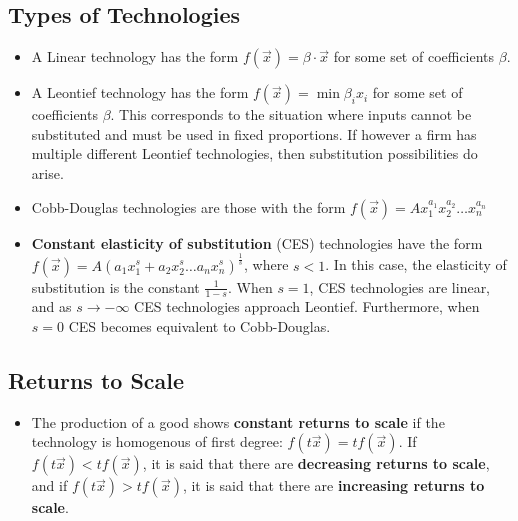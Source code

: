 \documentclass[a4paper]{article}
\begin{document}
\subsection{Types of Technologies}
\begin{itemize}
    \item A Linear technology has the form $f(\vec{x}) = \beta \cdot \vec{x}$ for some set of coefficients $\beta$.
    \item A Leontief technology has the form $f(\vec{x}) = \min{\beta_i x_i}$ for some set of coefficients $\beta$. This corresponds to the situation where inputs cannot be substituted and must be used in fixed proportions. If however a firm has multiple different Leontief technologies, then substitution possibilities do arise.
    \item Cobb-Douglas technologies are those with the form $f(\vec{x}) = Ax_1^{a_1}x_2^{a_2}\hdots x_n^{a_n}$
    \item \textbf{Constant elasticity of substitution} (CES) technologies have the form $f(\vec{x}) = A(a_1x_1^{s}+ a_2x_2^{s}\hdots a_n x_n^{s})^\frac{1}{s}$, where $s < 1$. In this case, the elasticity of substitution is the constant $\frac{1}{1-s}$. When $s = 1$, CES technologies are linear, and as $s \to -\infty$ CES technologies approach Leontief. Furthermore, when $s = 0$ CES becomes equivalent to Cobb-Douglas.
\end{itemize}

\subsection{Returns to Scale}
\begin{itemize}
    \item The production of a good shows \textbf{constant returns to scale} if the technology is homogenous of first degree: $f(t\vec{x}) = tf(\vec{x})$. If $f(t\vec{x}) < tf(\vec{x})$, it is said that there are \textbf{decreasing returns to scale}, and if $f(t\vec{x}) > tf(\vec{x})$, it is said that there are \textbf{increasing returns to scale}.
\end{itemize}
\end{document}
